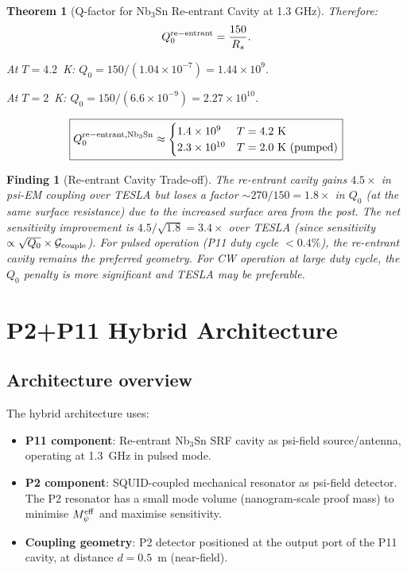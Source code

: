 \documentclass[11pt,twocolumn]{article}
\newcommand{\Meff}{M_\psi^{\rm eff}}
\newcommand{\ee}[1]{\times 10^{#1}}
\newtheorem{theorem}{Theorem}[section]
\newtheorem{finding}{Finding}[section]
\begin{document}
\begin{theorem}[Q-factor for Nb$_3$Sn Re-entrant Cavity at 1.3 GHz]
Therefore:
\begin{equation}
Q_0^{\rm re-entrant} = \frac{150}{R_s}.
\label{eq:Q0_reentrant}
\end{equation}

At $T = 4.2$~K: $Q_0 = 150/(1.04\ee{-7}) = 1.44\ee{9}$.

At $T = 2$~K: $Q_0 = 150/(6.6\ee{-9}) = 2.27\ee{10}$.

\begin{equation}
\boxed{Q_0^{\rm re-entrant, Nb_3Sn} \approx \begin{cases}
1.4\ee{9} & T = 4.2~\text{K}\\
2.3\ee{10} & T = 2.0~\text{K (pumped)}
\end{cases}}
\label{eq:Q0_reentrant_values}
\end{equation}
\end{theorem}

\begin{finding}[Re-entrant Cavity Trade-off]
\label{find:reentrant_tradeoff}
The re-entrant cavity gains $4.5\times$ in psi-EM coupling over TESLA
but loses a factor $\sim 270/150 = 1.8\times$ in $Q_0$ (at the same
surface resistance) due to the increased surface area from the post.
The net sensitivity improvement is $4.5/\sqrt{1.8} = 3.4\times$ over
TESLA (since sensitivity $\propto \sqrt{Q_0}\times\mathcal{G}_{\rm couple}$).
For pulsed operation (P11 duty cycle $< 0.4\%$), the re-entrant cavity
remains the preferred geometry. For CW operation at large duty cycle,
the $Q_0$ penalty is more significant and TESLA may be preferable.
\end{finding}


\section{P2+P11 Hybrid Architecture}
\label{sec:hybrid_architecture}

\subsection{Architecture overview}
\label{sec:hybrid_overview}

The hybrid architecture uses:
\begin{itemize}[nosep]
\item \textbf{P11 component}: Re-entrant Nb$_3$Sn SRF cavity as psi-field
  source/antenna, operating at 1.3~GHz in pulsed mode.
\item \textbf{P2 component}: SQUID-coupled mechanical resonator as
  psi-field detector. The P2 resonator has a small mode volume
  (nanogram-scale proof mass) to minimise $\Meff$ and maximise sensitivity.
\item \textbf{Coupling geometry}: P2 detector positioned at the output port
  of the P11 cavity, at distance $d = 0.5$~m (near-field).
\end{itemize}
\end{document}
